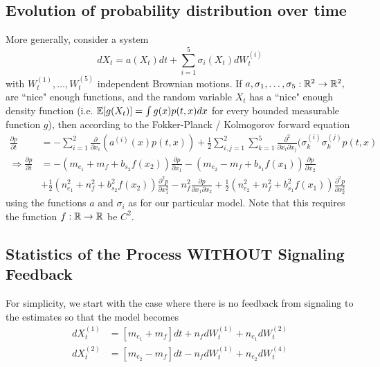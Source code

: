 \documentclass{article}
\begin{document}
\subsection{Evolution of probability distribution over time }
More generally, consider a system
$$ dX_t=a(X_t)dt+\sum_{i=1}^5\sigma_i(X_t)dW_t^{(i)}$$
with $W_t^{(1)},\dots,W_t^{(5)}$ independent Brownian motions.
If $a,\sigma_1,\dots,\sigma_5:{\mathbb{R}}^2\to{\mathbb{R}}^2,$ are ``nice" enough functions, and the random variable $X_t$ has a ``nice" enough density function (i.e. ${\mathbb{E}}[g(X_t)]=\int g(x)p(t,x)dx$ for every bounded measurable function $g$), then according to the Fokker-Planck / Kolmogorov forward equation
\begin{align*}
\frac{\partial p}{\partial t}&=-\sum_{i=1}^2\frac{\partial}{\partial x_i}(a^{(i)}(x)p(t,x))+\frac{1}{2}\sum_{i,j=1}^2\sum_{k=1}^5\frac{\partial^2}{\partial x_i\partial x_j}(\sigma_k^{(i)}\sigma_k^{(j)}p(t,x)
\\ \Rightarrow \frac{\partial p}{\partial t}&=-(m_{e_1}+m_f+b_{s_2}f(x_2))\frac{\partial p}{\partial x_1}-(m_{e_2}-m_f+b_{s_1}f(x_1))\frac{\partial p}{\partial x_2}
\\&+\frac{1}{2}(n_{e_1}^2+n_f^2+b_{s_2}^2f(x_2))\frac{\partial^2 p}{\partial x_1^2}-n_f^2\frac{\partial p}{\partial x_1\partial x_2}+\frac{1}{2}(n_{e_2}^2+n_f^2+b_{s_1}^2f(x_1))\frac{\partial^2 p}{\partial x_2^2}
\end{align*}
using the functions $a$ and $\sigma_i$ as for our particular model.  Note that this requires the function $f:{\mathbb{R}}\to{\mathbb{R}}$ be $C^2$.

\subsection{Statistics of the Process WITHOUT Signaling Feedback }
%
For simplicity, we start with the case where there is no feedback from signaling to the estimates so that the model becomes
\begin{align*}
dX_t^{(1)}&=\left[m_{e_1}+m_f\right]dt+n_fdW_t^{(1)}+n_{e_1}dW_t^{(2)}
\\ dX_t^{(2)}&=\left[m_{e_2}-m_f\right]dt-n_fdW_t^{(1)}+n_{e_2}dW_t^{(4)}
\end{align*}
\end{document}
